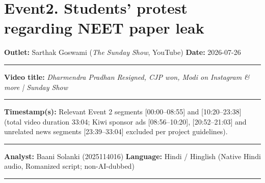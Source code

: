 \documentclass[10pt,a4paper]{article}
\newcommand{\formrule}{\par\vspace{3pt}\noindent\rule{\textwidth}{0.35pt}\par\vspace{7pt}}
\newcommand{\sectionrule}{\par\vspace{4pt}\noindent\rule{\textwidth}{0.4pt}\par\vspace{8pt}}
\begin{document}
\newpage
\section*{Event2. Students' protest regarding NEET paper leak}
\par\vspace{6pt}
{\small
\noindent\textbf{Outlet:} Sarthak Goswami (\emph{The Sunday Show}, YouTube) \hfill \textbf{Date:} 2026-07-26
\formrule
\noindent\textbf{Video title:} \emph{Dharmendra Pradhan Resigned, CJP won, Modi on Instagram \& more | Sunday Show}
\formrule
\noindent\textbf{Timestamp(s):} Relevant Event 2 segments [00:00--08:55] and [10:20--23:38] (total video duration 33:04; Kiwi sponsor ads [08:56--10:20], [20:52--21:03] and unrelated news segments [23:39--33:04] excluded per project guidelines).
\formrule
\noindent\textbf{Analyst:} Baani Solanki (2025114016) \hfill \textbf{Language:} Hindi / Hinglish (Native Hindi audio, Romanized script; non-AI-dubbed)
}
\sectionrule
\end{document}
